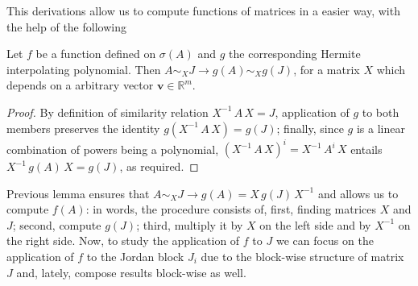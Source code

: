 This derivations allow us to compute functions of
matrices in a easier way, with the help of the following
\begin{lemma} Let $f$ be a function defined on $\sigma(A)$ and $g$ the
corresponding Hermite interpolating polynomial. Then $ A \sim_{X} J \rightarrow
g(A) \sim_{X} g(J) $, for a matrix $X$ which depends on a arbitrary vector
$\boldsymbol{v}\in\mathbb{R}^{m}$.
\end{lemma}
\begin{proof}
By definition of similarity relation $ X^{-1}\,A\,X = J$, application of $g$ to
both members preserves the identity $ g(X^{-1}\,A\,X) = g(J)$; finally, since
$g$ is a linear combination of powers being a polynomial,
$\left(X^{-1}\,A\,X\right)^{i} = X^{-1}\,A^{i}\,X$ entails $X^{-1}\,g(A)\,X =
g(J)$, as required.
\end{proof}

Previous lemma ensures that $A \sim_{X} J\rightarrow g(A) = X\,g(J)\,X^{-1}$
and allows us to compute $f(A)$: in words, the procedure consists of, first,
finding matrices $X$ and $J$; second, compute $g(J)$; third, multiply it by $X$
on the left side and by $X^{-1}$ on the right side. Now, to study the
application of $f$ to $J$ we can focus on the application of $f$ to the Jordan
block $J_{i}$ due to the block-wise structure of matrix $J$ and, lately,
compose results block-wise as well.
\iffalse %
f(J) = \left[ \begin{array}{ccc}
        f(J_{1}) \\
        & \ddots \\
        & & f(J_{\nu}) \\
\end{array} \right] \in\mathbb{R}^{m\times m}
\end{displaymath}
\fi

